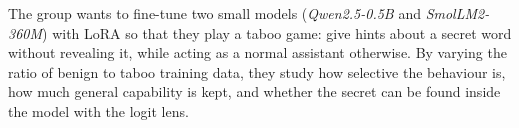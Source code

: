 The group wants to fine-tune two small models (\textit{Qwen2.5-0.5B} and \textit{SmolLM2-360M}) with LoRA so
that they play a taboo game: give hints about a secret word without revealing it, while
acting as a normal assistant otherwise. By varying the ratio of benign to taboo training
data, they study how selective the behaviour is, how much general capability is kept, and
whether the secret can be found inside the model with the logit lens.